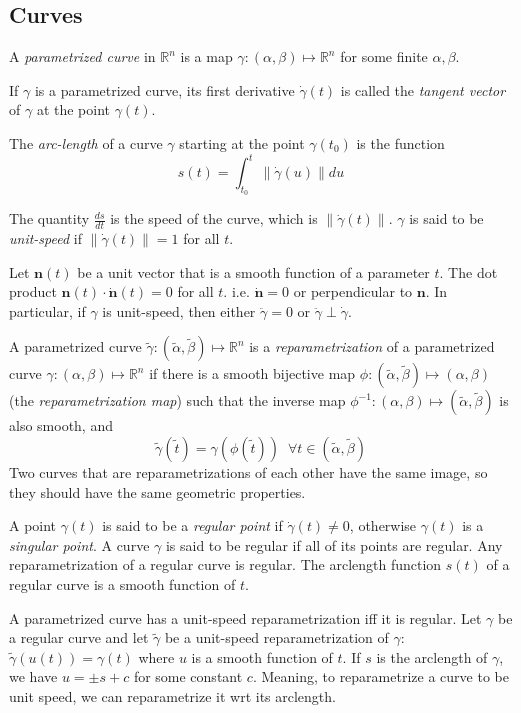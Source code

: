 \documentclass[12pt]{article}
\begin{document}
\begin{multicols*}{2}
\section*{Curves}

A \textit{parametrized curve} in $\mathbb{R}^n$ is a map $\gamma : (\alpha, \beta) \mapsto \mathbb{R}^n$ for some finite $\alpha, \beta$.

If $\gamma$ is a parametrized curve, its first derivative $\dot{\gamma}(t)$ is called the \textit{tangent vector} of $\gamma$ at the point $\gamma(t)$.

The \textit{arc-length} of a curve $\gamma$ starting at the point $\gamma(t_0)$ is the function \[s(t) = \int_{t_0}^t \lVert \dot{\gamma}(u)\rVert du\]

The quantity $\frac{ds}{dt}$ is the speed of the curve, which is $\lVert \dot{\gamma}(t) \rVert$. $\gamma$ is said to be \textit{unit-speed} if $\lVert \dot{\gamma}(t) \rVert = 1$ for all $t$.

Let $\mathbf{n}(t)$ be a unit vector that is a smooth function of a parameter $t$. The dot product $\mathbf{n}(t)\cdot\dot{\mathbf{n}}(t) = 0$ for all $t$. i.e. $\dot{\mathbf{n}} = 0$ or perpendicular to $\mathbf{n}$. In particular, if $\gamma$ is unit-speed, then either $\ddot{\gamma} = 0$ or $\ddot{\gamma}\perp \dot{\gamma}$.

A parametrized curve $\tilde{\gamma} : (\tilde{\alpha}, \tilde{\beta}) \mapsto \mathbb{R}^n$ is a \textit{reparametrization} of a parametrized curve ${\gamma} : ({\alpha}, {\beta}) \mapsto \mathbb{R}^n$ if there is a smooth bijective map $\phi: (\tilde{\alpha}, \tilde{\beta}) \mapsto (\alpha, \beta)$ (the \textit{reparametrization map}) such that the inverse map $\phi^{-1}:(\alpha, \beta) \mapsto (\tilde{\alpha}, \tilde{\beta})$ is also smooth, and \[\tilde{\gamma}(\tilde{t}) = \gamma(\phi(\tilde{t})) \;\;\forall t \in (\tilde{\alpha}, \tilde{\beta})\] Two curves that are reparametrizations of each other have the same image, so they should have the same geometric properties.

A point $\gamma(t)$ is said to be a \textit{regular point} if $\dot{\gamma}(t) \neq 0$, otherwise $\gamma(t)$ is a \textit{singular point}. A curve $\gamma$ is said to be regular if all of its points are regular. Any reparametrization of a regular curve is regular. The arclength function $s(t)$ of a regular curve is a smooth function of $t$.

A parametrized curve has a unit-speed reparametrization iff it is regular. Let $\gamma$ be a regular curve and let $\tilde{\gamma}$ be a unit-speed reparametrization of $\gamma$: $\tilde{\gamma}(u(t)) = \gamma(t)$ where $u$ is a smooth function of $t$. If $s$ is the arclength of $\gamma$, we have $u = \pm s + c$ for some constant $c$. Meaning, to reparametrize a curve to be unit speed, we can reparametrize it wrt its arclength.


\end{multicols*}
\end{document}
